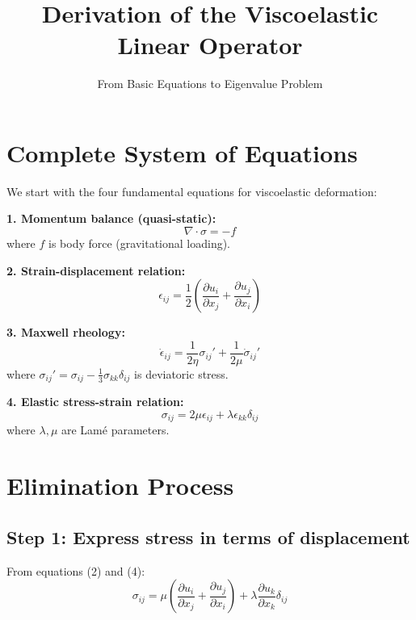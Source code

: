 \documentclass{article}
\title{Derivation of the Viscoelastic Linear Operator}
\author{From Basic Equations to Eigenvalue Problem}
\date{}
\begin{document}
\maketitle

\section{Complete System of Equations}

We start with the four fundamental equations for viscoelastic deformation:

\textbf{1. Momentum balance (quasi-static):}
\begin{equation}
\nabla \cdot \sigma = -f
\end{equation}
where $f$ is body force (gravitational loading).

\textbf{2. Strain-displacement relation:}
\begin{equation}
\epsilon_{ij} = \frac{1}{2}\left(\frac{\partial u_i}{\partial x_j} + \frac{\partial u_j}{\partial x_i}\right)
\end{equation}

\textbf{3. Maxwell rheology:}
\begin{equation}
\dot{\epsilon}_{ij} = \frac{1}{2\eta}\sigma_{ij}' + \frac{1}{2\mu}\dot{\sigma}_{ij}'
\end{equation}
where $\sigma_{ij}' = \sigma_{ij} - \frac{1}{3}\sigma_{kk}\delta_{ij}$ is deviatoric stress.

\textbf{4. Elastic stress-strain relation:}
\begin{equation}
\sigma_{ij} = 2\mu\epsilon_{ij} + \lambda\epsilon_{kk}\delta_{ij}
\end{equation}
where $\lambda, \mu$ are Lamé parameters.

\section{Elimination Process}

\subsection{Step 1: Express stress in terms of displacement}

From equations (2) and (4):
\begin{equation}
\sigma_{ij} = \mu\left(\frac{\partial u_i}{\partial x_j} + \frac{\partial u_j}{\partial x_i}\right) + \lambda\frac{\partial u_k}{\partial x_k}\delta_{ij}
\end{equation}
\end{document}
